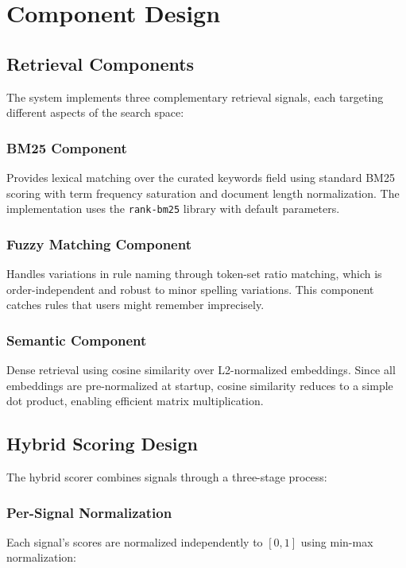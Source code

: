 \section{Component Design}

\subsection{Retrieval Components}

The system implements three complementary retrieval signals, each targeting different aspects of the search space:

\subsubsection{BM25 Component}
Provides lexical matching over the curated keywords field using standard BM25 scoring with term frequency saturation and document length normalization. The implementation uses the \texttt{rank-bm25} library with default parameters.

\subsubsection{Fuzzy Matching Component}
Handles variations in rule naming through token-set ratio matching, which is order-independent and robust to minor spelling variations. This component catches rules that users might remember imprecisely.

\subsubsection{Semantic Component}
Dense retrieval using cosine similarity over L2-normalized embeddings. Since all embeddings are pre-normalized at startup, cosine similarity reduces to a simple dot product, enabling efficient matrix multiplication.

\subsection{Hybrid Scoring Design}

The hybrid scorer combines signals through a three-stage process:

\subsubsection{Per-Signal Normalization}
Each signal's scores are normalized independently to $[0,1]$ using min-max normalization:

